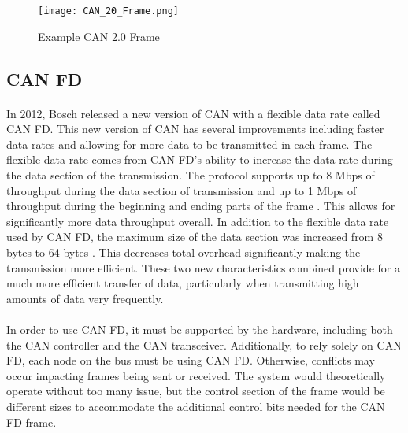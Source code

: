 \begin{figure}[H]
	\centering
	\texttt{[image: CAN\_20\_Frame.png]}
	\caption{Example CAN 2.0 Frame \cite{wikipediaCAN}}
	\label{fig:CANDataFrame}
\end{figure}

\subsection{CAN FD}

\paragraph{}
In 2012, Bosch released a new version of CAN with a flexible data rate called CAN FD.
This new version of CAN has several improvements including faster data rates and allowing for more data to be transmitted in each frame.
The flexible data rate comes from CAN FD's ability to increase the data rate during the data section of the transmission.
The protocol supports up to 8 Mbps of throughput during the data section of transmission and up to 1 Mbps of throughput during the beginning and ending parts of the frame \cite{BOSCH_CANFD}.
This allows for significantly more data throughput overall.
In addition to the flexible data rate used by CAN FD, the maximum size of the data section was increased from 8 bytes to 64 bytes \cite{BOSCH_CANFD}.
This decreases total overhead significantly making the transmission more efficient.
These two new characteristics combined provide for a much more efficient transfer of data, particularly when transmitting high amounts of data very frequently.

\paragraph{}
In order to use CAN FD, it must be supported by the hardware, including both the CAN controller and the CAN transceiver.
Additionally, to rely solely on CAN FD, each node on the bus must be using CAN FD.
Otherwise, conflicts may occur impacting frames being sent or received.
The system would theoretically operate without too many issue, but the control section of the frame would be different sizes to accommodate the additional control bits needed for the CAN FD frame.